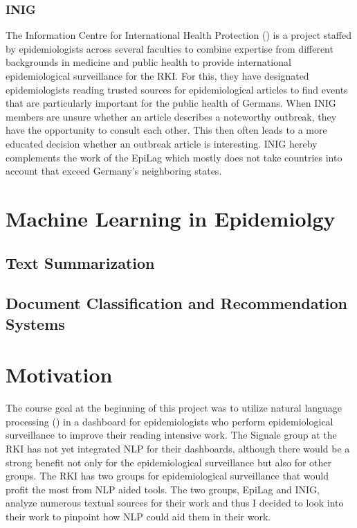 \subsubsection{INIG}
The Information Centre for International Health Protection () is a project staffed by epidemiologists across several faculties to combine expertise from different backgrounds in medicine and public health to provide international epidemiological surveillance for the RKI. For this, they have designated epidemiologists reading trusted sources for epidemiological articles to find events that are particularly important for the public health of Germans. When INIG members are unsure whether an article describes a noteworthy outbreak, they have the opportunity to consult each other. This then often leads to a more educated decision whether an outbreak article is interesting. INIG hereby complements the work of the EpiLag which mostly does not take countries into account that exceed Germany's neighboring states.

\section{Machine Learning in Epidemiolgy}

\subsection{Text Summarization}

\subsection{Document Classification and Recommendation Systems}



\section{Motivation}
The course goal at the beginning of this project was to utilize natural language
processing () in a dashboard for epidemiologists who perform epidemiological
surveillance to improve their reading intensive work.
The Signale group at the RKI has not yet integrated NLP for their dashboards, although there would be a strong benefit not only for the epidemiological surveillance but also for other groups. The RKI has two groups for epidemiological surveillance that would profit the most from NLP aided tools. The two groups, EpiLag and INIG, analyze numerous textual sources for their work and thus I decided to look into their work to pinpoint how NLP could aid them in their work.


